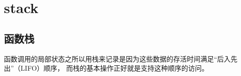 \documentclass[UTF8]{ctexart}
\begin{document}
\section{stack}
\subsection{函数栈}
函数调用的局部状态之所以用栈来记录是因为这些数据的存活时间满足“后入先出”（LIFO）顺序，
而栈的基本操作正好就是支持这种顺序的访问。
\end{document}
